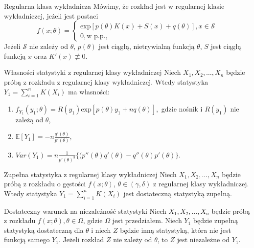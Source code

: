 \documentclass[avery5371, grid, frame]{flashcards}
\begin{document}
\begin{flashcard}[Definicja]{Regularna klasa wykładnicza}
    Mówimy, że rozkład jest w regularnej klasie wykładniczej, jeżeli jest postaci
    $$ f(x; \theta) =
    \begin{cases}
        \text{exp}[p(\theta) K(x) + S(x) + q(\theta)], x \in \mathcal{S} \\
        0, \text{w p.p.,}
    \end{cases} $$
    Jeżeli $\mathcal{S}$ nie zależy od $\theta$, $p(\theta)$ jest ciągłą, nietrywialną funkcją $\theta$, $S$ jest ciągłą funkcją $x$ oraz $K'(x) \not\equiv 0$.
\end{flashcard}

\begin{flashcard}[Twierdzenie]{Własności statystyki z regularnej klasy wykładniczej}
    Niech $X_1, X_2, \dots, X_n$ będzie próbą z rozkładu z regularnej klasy wykładniczej. Wtedy statystyka $Y_1 = \sum_{i=1}^n K(X_i)$ ma własności:
    \begin{enumerate}
        \item $f_{Y_1}(y_1; \theta) = R(y_1) \text{exp}[p(\theta) y_1 + n q(\theta)],$ gdzie nośnik i $R(y_1)$ nie zależą od $\theta$,
        \item $\mathbb{E}[Y_1] = -n \frac{q'(\theta)}{p'(\theta)}$,
        \item $Var(Y_1) = n \frac{1}{p'(\theta)^3} \{ (p''(\theta)q'(\theta) - q''(\theta)p'(\theta) \} $.
    \end{enumerate}
\end{flashcard}

\begin{flashcard}[Twierdzenie]{Zupełna statystyka z regularnej klasy wykładniczej}
    Niech $X_1, X_2, \dots, X_n$ będzie próbą z rozkładu o gęstości $f(x; \theta)$, $\theta \in (\gamma, \delta)$ z regularnej klasy wykładniczej. Wtedy statystyka $Y_1 = \sum_{i=1}^n K(X_i)$ jest dostateczną statystyką zupełną.
\end{flashcard}

\begin{flashcard}[Twierdzenie]{Dostateczny warunek na niezależność statystyki}
    Niech $X_1, X_2, \dots, X_n$ będzie próbą z rozkładu $f(x; \theta), \theta \in \Omega$, gdzie $\Omega$ jest przedziałem. Niech $Y_1$ będzie zupełną statystyką dostateczną dla $\theta$ i niech $Z$ będzie inną statystyką, która nie jest funkcją samego $Y_1$. Jeżeli rozkład $Z$ nie zależy od $\theta$, to $Z$ jest niezależne od $Y_1$.
\end{flashcard}
\end{document}
